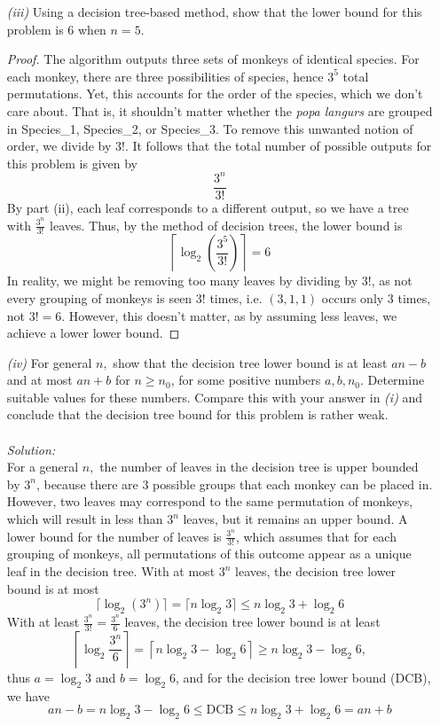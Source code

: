 \documentclass[12pt]{article}
\theoremstyle{definition}
\theoremstyle{remark}
\newcommand\sol{%
  \\ 
  \\
  \textit{Solution:}\\%
}
\begin{document}
\begin{enumerate}
\begin{enumerate}
\begin{proof}
\end{proof}
     \item[\it (iii)] Using a decision tree-based method, show that the lower bound for this problem is 6 when $n = 5$.
     \begin{proof} 
      The algorithm outputs three sets of monkeys of identical species. For each monkey, there are three possibilities of species, hence $3^5$ total permutations. Yet, this accounts for the order of the species, which we don't care about. That is, it shouldn't matter whether the \textit{popa langurs} are grouped in Species\_1, Species\_2, or Species\_3. To remove this unwanted notion of order, we divide by $3!$. It follows that the total number of possible outputs for this problem is given by
    $$\frac{3^n}{3!} $$
       By part (ii), each leaf corresponds to a different output, so we have a tree with $\frac{3^n}{3!}$ leaves. Thus, by the method of decision trees, the lower bound is
    $$\left\lceil\log_{2}\left( \frac{3^5}{3!} \right)\right\rceil = 6$$
       In reality, we might be removing too many leaves by dividing by $3!$, as not every grouping of monkeys is seen $3!$ times, i.e. $(3,1,1)$ occurs only $3$ times, not $3! = 6.$ However, this doesn't matter, as by assuming less leaves, we achieve a lower lower bound.
     \end{proof}
  \item[\it (iv)] For general $n,$ show that the decision tree lower bound is at least $an- b$ and at most $an + b$
    for $n \geq n_0$, for some positive numbers $a, b, n_0$. Determine suitable values for these numbers. Compare this with your answer in \textit{(i)} and conclude that the decision tree bound for this problem is rather weak.
    \sol 
     For a general $n,$ the number of leaves in the decision tree is upper bounded by $3^n$, because there are 3 possible groups that each monkey can be placed in. However, two leaves may correspond to the same permutation of monkeys, which will result in less than $3^n$ leaves, but it remains an upper bound. A lower bound for the number of leaves is $\frac{3^n }{3!} $, which assumes that for each grouping of monkeys, all permutations of this outcome appear as a unique leaf in the decision tree. With at most $3^n$ leaves, the decision tree lower bound is at most $$\lceil \log_2 (3^n)\rceil = \lceil n \log_2 3\rceil \leq n \log_2 3 + \log_2 6 $$ 
     With at least $\frac{3^n}{3!} = \frac{3^n }{6} $ leaves, the decision tree lower bound is at least $$\left\lceil\log_2 \frac{3^n}{6} \right\rceil = \left\lceil n \log _2 3 - \log_2 6 \right\rceil \geq n \log _2 3 - \log _2 6, $$
     thus $a = \log_2 3 $ and $b = \log_2 6$, and for the decision tree lower bound (DCB), we have 
     $$an -b = n\log_2 3  - \log_2 6 \leq \text{DCB} \leq n \log_2 3 + \log_2 6 = an +b  $$
   

\end{enumerate}
\end{enumerate}
\end{document}
